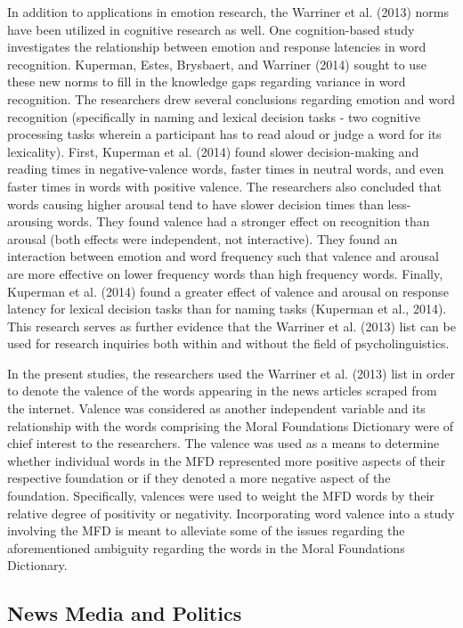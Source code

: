 \documentclass[,man]{apa6}
\begin{document}
In addition to applications in emotion research, the Warriner et al.
(2013) norms have been utilized in cognitive research as well. One
cognition-based study investigates the relationship between emotion and
response latencies in word recognition. Kuperman, Estes, Brysbaert, and
Warriner (2014) sought to use these new norms to fill in the knowledge
gaps regarding variance in word recognition. The researchers drew
several conclusions regarding emotion and word recognition (specifically
in naming and lexical decision tasks - two cognitive processing tasks
wherein a participant has to read aloud or judge a word for its
lexicality). First, Kuperman et al. (2014) found slower decision-making
and reading times in negative-valence words, faster times in neutral
words, and even faster times in words with positive valence. The
researchers also concluded that words causing higher arousal tend to
have slower decision times than less-arousing words. They found valence
had a stronger effect on recognition than arousal (both effects were
independent, not interactive). They found an interaction between emotion
and word frequency such that valence and arousal are more effective on
lower frequency words than high frequency words. Finally, Kuperman et
al. (2014) found a greater effect of valence and arousal on response
latency for lexical decision tasks than for naming tasks (Kuperman et
al., 2014). This research serves as further evidence that the Warriner
et al. (2013) list can be used for research inquiries both within and
without the field of psycholinguistics.

In the present studies, the researchers used the Warriner et al. (2013)
list in order to denote the valence of the words appearing in the news
articles scraped from the internet. Valence was considered as another
independent variable and its relationship with the words comprising the
Moral Foundations Dictionary were of chief interest to the researchers.
The valence was used as a means to determine whether individual words in
the MFD represented more positive aspects of their respective foundation
or if they denoted a more negative aspect of the foundation.
Specifically, valences were used to weight the MFD words by their
relative degree of positivity or negativity. Incorporating word valence
into a study involving the MFD is meant to alleviate some of the issues
regarding the aforementioned ambiguity regarding the words in the Moral
Foundations Dictionary.

\subsection{News Media and Politics}\label{news-media-and-politics}
\end{document}
